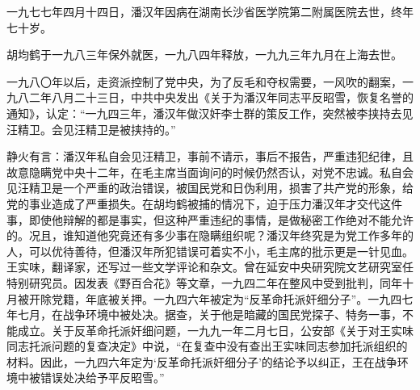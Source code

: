 \begin{maonote}
一九七七年四月十四日，潘汉年因病在湖南长沙省医学院第二附属医院去世，终年七十岁。

胡均鹤于一九八三年保外就医，一九八四年释放，一九九三年九月在上海去世。

一九八〇年以后，走资派控制了党中央，为了反毛和夺权需要，一风吹的翻案，一九八二年八月二十三日，中共中央发出《关于为潘汉年同志平反昭雪，恢复名誉的通知》，认定：“一九四三年，潘汉年做汉奸李士群的策反工作，突然被李挟持去见汪精卫。会见汪精卫是被挟持的。”

静火有言：潘汉年私自会见汪精卫，事前不请示，事后不报告，严重违犯纪律，且故意隐瞒党中央十二年，在毛主席当面询问的时候仍然否认，对党不忠诚。私自会见汪精卫是一个严重的政治错误，被国民党和日伪利用，损害了共产党的形象，给党的事业造成了严重损失。在胡均鹤被捕的情况下，迫于压力潘汉年才交代这件事，即使他辩解的都是事实，但这种严重违纪的事情，是做秘密工作绝对不能允许的。况且，谁知道他究竟还有多少事在隐瞒组织呢？潘汉年终究是为党工作多年的人，可以优待善待，但潘汉年所犯错误可着实不小，毛主席的批示更是一针见血。
王实味，翻译家，还写过一些文学评论和杂文。曾在延安中央研究院文艺研究室任特别研究员。因发表《野百合花》等文章，一九四二年在整风中受到批判，同年十月被开除党籍，年底被关押。一九四六年被定为“反革命托派奸细分子”。一九四七年七月，在战争环境中被处决。据查，关于他是暗藏的国民党探子、特务一事，不能成立。关于反革命托派奸细问题，一九九一年二月七日，公安部《关于对王实味同志托派问题的复查决定》中说，“在复查中没有查出王实味同志参加托派组织的材料。因此，一九四六年定为‘反革命托派奸细分子’的结论予以纠正，王在战争环境中被错误处决给予平反昭雪。”
\end{maonote}
